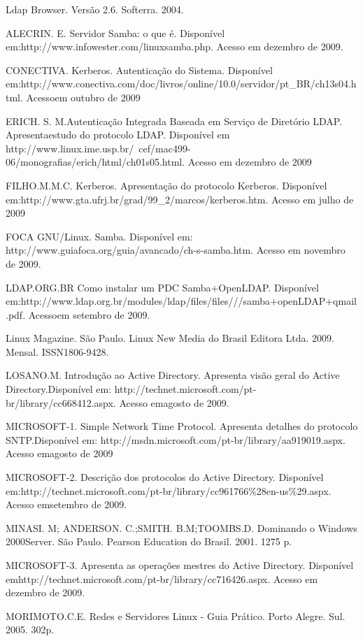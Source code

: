 Ldap Browser. Versão 2.6. Softerra. 2004.

ALECRIN. E. Servidor Samba: o que é. Disponível em:http://www.infowester.com/linuxsamba.php. Acesso em dezembro de 2009.

CONECTIVA. Kerberos. Autenticação do Sistema. Disponível em:http://www.conectiva.com/doc/livros/online/10.0/servidor/pt\_BR/ch13s04.html. Acessoem outubro de 2009

ERICH. S. M.Autenticação Integrada Baseada em Serviço de Diretório LDAP. Apresentaestudo do protocolo LDAP. Disponível em http://www.linux.ime.usp.br/~cef/mac499-06/monografias/erich/html/ch01s05.html. Acesso em dezembro de 2009

FILHO.M.M.C. Kerberos. Apresentação do protocolo Kerberos. Disponível em:http://www.gta.ufrj.br/grad/99\_2/marcos/kerberos.htm. Acesso em julho de 2009

FOCA GNU/Linux. Samba. Disponível em: http://www.guiafoca.org/guia/avancado/ch-s-samba.htm. Acesso em novembro de 2009.

LDAP.ORG.BR Como instalar um PDC Samba+OpenLDAP. Disponível em:http://www.ldap.org.br/modules/ldap/files/files///samba+openLDAP+qmail.pdf. Acessoem setembro de 2009.

Linux Magazine. São Paulo. Linux New Media do Brasil Editora Ltda. 2009. Mensal. ISSN1806-9428.

LOSANO.M. Introdução ao Active Directory. Apresenta visão geral do Active Directory.Disponível em: http://technet.microsoft.com/pt-br/library/cc668412.aspx. Acesso emagosto de 2009.

MICROSOFT-1. Simple Network Time Protocol. Apresenta detalhes do protocolo SNTP.Disponível em: http://msdn.microsoft.com/pt-br/library/aa919019.aspx. Acesso emagosto de 2009

MICROSOFT-2. Descrição dos protocolos do Active Directory. Disponível em:http://technet.microsoft.com/pt-br/library/cc961766\%28en-us\%29.aspx. Acesso emsetembro de 2009.

MINASI. M; ANDERSON. C.;SMITH. B.M;TOOMBS.D. Dominando o Windows 2000Server. São Paulo. Pearson Education do Brasil. 2001. 1275 p.

MICROSOFT-3. Apresenta as operações mestres do Active Directory. Disponível emhttp://technet.microsoft.com/pt-br/library/cc716426.aspx. Acesso em dezembro de 2009.

MORIMOTO.C.E. Redes e Servidores Linux - Guia Prático. Porto Alegre. Sul. 2005. 302p.